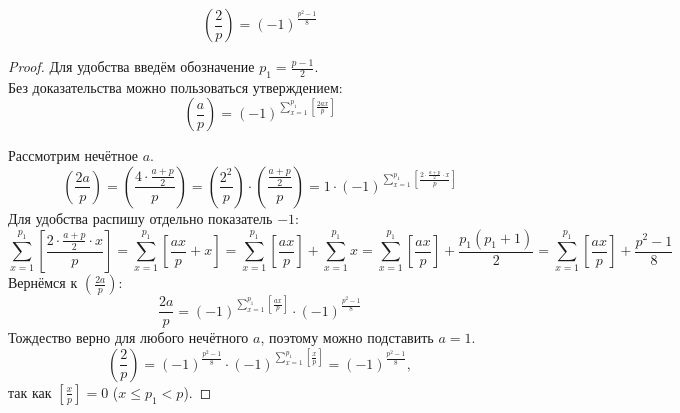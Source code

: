 \begin{theorem}
    $$
        \left(\frac{2}{p}\right) = (-1)^{\frac{p^2 - 1}{8}}
    $$
    \begin{proof}
        Для удобства введём обозначение $p_1 = \frac{p - 1}{2}$.\\
        
        Без доказательства можно пользоваться утверждением:\\
        $$
            \left(\frac{a}{p}\right) = (-1)^{ \sum \limits_{x=1}^{ p_1 } \left[ \frac{2ax}{p} \right] }
        $$
        
        Рассмотрим нечётное $a$.\\
        $$
            \left(\frac{2a}{p}\right) = \left(\frac{4 \cdot \frac{a + p}{2}}{p}\right) = \left(\frac{2^2}{p}\right) \cdot \left(\frac{ \frac{a + p}{2} }{p}\right) = 1 \cdot (-1) ^ {\sum \limits_{x=1}^{ p_1 } \left[ \frac{2 \cdot \frac{a + p}{2} \cdot x}{p} \right] }
        $$
        Для удобства распишу отдельно показатель $-1$:\\
        $$
            \sum \limits_{x=1}^{ p_1 } \left[ \frac{2 \cdot \frac{a + p}{2} \cdot x}{p} \right] = \sum \limits_{x=1}^{p_1} \left[ \frac{ax}{p} + x \right] = \sum \limits_{x=1}^{p_1} \left[ \frac{ax}{p} \right] + \sum \limits_{x=1}^{p_1} x = \sum \limits_{x=1}^{p_1} \left[ \frac{ax}{p} \right] + \frac{p_1(p_1 + 1)}{2} = \sum \limits_{x=1}^{p_1} \left[ \frac{ax}{p} \right] + \frac{p^2 - 1}{8}
        $$
        Вернёмся к $\left(\frac{2a}{p}\right)$:
        $$
            \frac{2a}{p} = (-1)^{ \sum \limits_{x=1}^{p_1} \left[ \frac{ax}{p} \right] } \cdot (-1)^{ \frac{p^2 - 1}{8} }
        $$
        Тождество верно для любого нечётного $a$, поэтому можно подставить $a = 1$.
        $$
            \left(\frac{2}{p}\right) = (-1)^{ \frac{p^2 - 1}{8} } \cdot (-1)^{ \sum \limits_{x=1}^{p_1} \left[ \frac{x}{p} \right] } = (-1)^{ \frac{p^2 - 1}{8} },
        $$
        так как $\left[ \frac{x}{p} \right] = 0$ ($x \leq p_1 < p$).
    \end{proof}
\end{theorem}